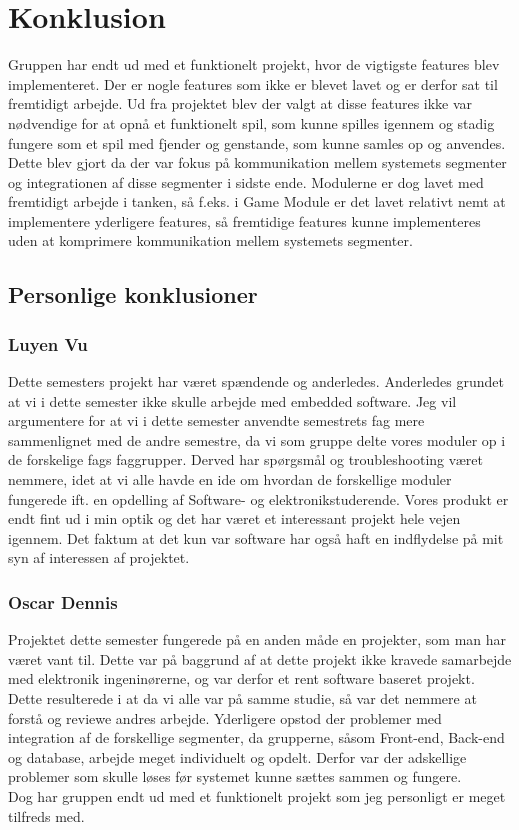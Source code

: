 \section{Konklusion}
Gruppen har endt ud med et funktionelt projekt, hvor de vigtigste features blev implementeret. Der er nogle features som ikke er blevet lavet og er derfor sat til fremtidigt arbejde. Ud fra projektet blev der valgt at disse features ikke var nødvendige for at opnå et funktionelt spil, som kunne spilles igennem og stadig fungere som et spil med fjender og genstande, som kunne samles op og anvendes.\\ Dette blev gjort da der var fokus på kommunikation mellem systemets segmenter og integrationen af disse segmenter i sidste ende. Modulerne er dog lavet med fremtidigt arbejde i tanken, så f.eks. i Game Module er det lavet relativt nemt at implementere yderligere features, så fremtidige features kunne implementeres uden at komprimere kommunikation mellem systemets segmenter.

\subsection{Personlige konklusioner}

\subsubsection{Luyen Vu}
Dette semesters projekt har været spændende og anderledes. Anderledes grundet at vi i dette semester ikke skulle arbejde med embedded software. Jeg vil argumentere for at vi i dette semester anvendte semestrets fag mere sammenlignet med de andre semestre, da vi som gruppe delte vores moduler op i de forskelige fags faggrupper. Derved har spørgsmål og troubleshooting været nemmere, idet at vi alle havde en ide om hvordan de forskellige moduler fungerede ift. en opdelling af Software- og elektronikstuderende. 
Vores produkt er endt fint ud i min optik og det har været et interessant projekt hele vejen igennem. Det faktum at det kun var software har også haft en indflydelse på mit syn af interessen af projektet.

\subsubsection{Oscar Dennis}
Projektet dette semester fungerede på en anden måde en projekter, som man har været vant til. Dette var på baggrund af at dette projekt ikke kravede samarbejde med elektronik ingeninørerne, og var derfor et rent software baseret projekt. Dette resulterede i at da vi alle var på samme studie, så var det nemmere at forstå og reviewe andres arbejde. Yderligere opstod der problemer med integration af de forskellige segmenter, da grupperne, såsom Front-end, Back-end og database, arbejde meget individuelt og opdelt. Derfor var der adskellige problemer som skulle løses før systemet kunne sættes sammen og fungere.\\
Dog har gruppen endt ud med et funktionelt projekt som jeg personligt er meget tilfreds med.



